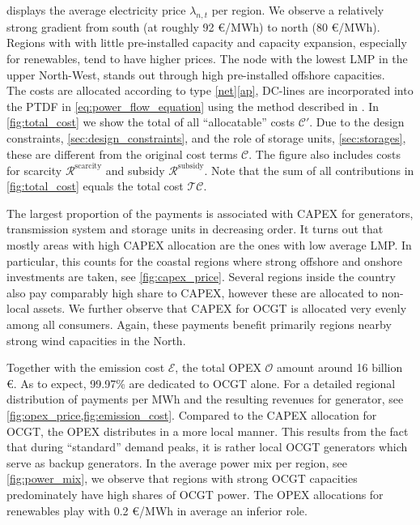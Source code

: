 \documentclass[11pt,twocolumn]{article}
\newcommand{\lmp}[1][n]{\lambda_{#1,t}}
\newcommand{\totalcost}{\mathcal{TC}}
\newcommand{\cost}{\mathcal{C}}
\newcommand{\opex}{\mathcal{O}}
\newcommand{\emissioncost}{\mathcal{E}}
\newcommand{\remainingcost}{\mathcal{R}}
\newcommand{\scarcitycost}{\remainingcost^\text{scarcity}}
\newcommand{\subsidycost}{\remainingcost^\text{subsidy}}
\begin{document}
 displays the average electricity price $\lmp$ per region. We observe a relatively strong gradient from south (at roughly 92 \euro/MWh) to north (80 \euro/MWh). Regions with with little pre-installed capacity and capacity expansion, especially for renewables, tend to have higher prices. The node with the lowest LMP in the upper North-West, stands out through high pre-installed offshore capacities. \\
 
The costs are allocated according to type \ref{net}\ref{ap}, DC-lines are incorporated into the PTDF in \cref{eq:power_flow_equation} using the method described in \cite{hofmann_flow_2020-1}.
In \cref{fig:total_cost} we show the total of all ``allocatable'' costs $\cost'$. Due to the design constraints, \cref{sec:design_constraints}, and the role of storage units, \cref{sec:storages}, these are different from the original cost terms $\cost$. The figure also includes costs for scarcity $\scarcitycost$ and subsidy  $\subsidycost$. Note that the sum of all contributions in \cref{fig:total_cost} equals the total cost $\totalcost$.  


The largest proportion of the payments is associated with CAPEX for generators, transmission system and storage units in decreasing order. 
It turns out that  mostly areas with high CAPEX allocation are the ones with low average LMP. In particular, this counts for the coastal regions where strong offshore and onshore investments are taken, see \cref{fig:capex_price}. Several regions inside the country also pay comparably high share to CAPEX, however these are allocated to non-local assets. We further observe that CAPEX for OCGT is allocated very evenly among all consumers. Again, these payments benefit primarily regions nearby strong wind capacities in the North.  

Together with the emission cost $\emissioncost$, the total OPEX $\opex$ amount around 16 billion \euro. As to expect, 99.97\% are dedicated to OCGT alone. For a detailed regional distribution of payments per MWh and the resulting revenues for generator, see \cref{fig:opex_price,fig:emission_cost}. Compared to the CAPEX allocation for OCGT, the OPEX distributes in a more local manner. This results from the fact that during ``standard'' demand peaks, it is rather local OCGT generators which serve as backup generators. In the average power mix per region, see \cref{fig:power_mix}, we observe that regions with strong OCGT capacities predominately have high shares of OCGT power. The OPEX allocations for renewables play with 0.2 \euro/MWh in average an inferior role. 
\end{document}
